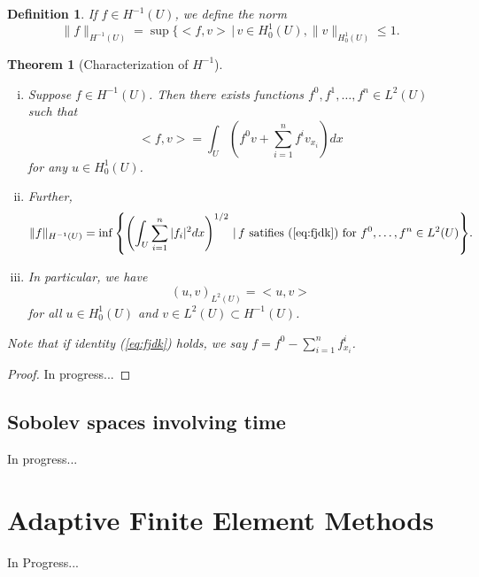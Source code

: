 \documentclass[11pt]{article}
\newtheorem{theorem}{Theorem}
\newtheorem{definition}{Definition}
\theoremstyle{definition}
\begin{document}
\begin{definition}
	If $f \in H^{-1}(U)$, we define the norm
	\begin{equation*}
		\|f\|_{H^{-1}(U)} = \sup{\{<f,v> \,|\, v\in H_0^1(U), \|v\|_{H_0^1(U)} \leq 1}.
	\end{equation*}
\end{definition}

\begin{theorem}[Characterization of $H^{-1}$]~ 
	\begin{enumerate}[(i)]
		\item Suppose $f\in H^{-1}(U)$. Then there exists functions $f^0,f^1,\dots,f^n \in L^2(U)$ such that
			\begin{equation}
				\label{eq:fjdk}
				<f,v> = \int_U \left(f^0v + \sum_{i=1}^n f^iv_{x_i}\right)dx
			\end{equation}
			for any $u \in H_0^1(U)$.
		\item Further,
			\begin{equation*}
				\|f\|_{H^{-1}(U)} = \inf{\left\{\left(\int_U \sum_{i=1}^n |f_i|^2dx\right)^{1/2} \,|\, f \text{ satifies } (\ref{eq:fjdk}) \text{ for } f^0,\dots,f^n \in L^2(U)\right\}}.
			\end{equation*}
		\item In particular, we have
			\begin{equation}
				(u,v)_{L^2(U)} = <u,v>
			\end{equation}
			for all $u \in H_0^1(U)$ and $v \in L^2(U) \subset H^{-1}(U)$.
	\end{enumerate}
	Note that if identity (\ref{eq:fjdk}) holds, we say $f = f^0 - \sum_{i=1}^n f_{x_i}^i$.
\end{theorem}
\begin{proof}
	In progress...
\end{proof}

\newpage

\subsection{Sobolev spaces involving time}
In progress...

\newpage

\section{Adaptive Finite Element Methods}
In Progress...

\newpage
\end{document}
